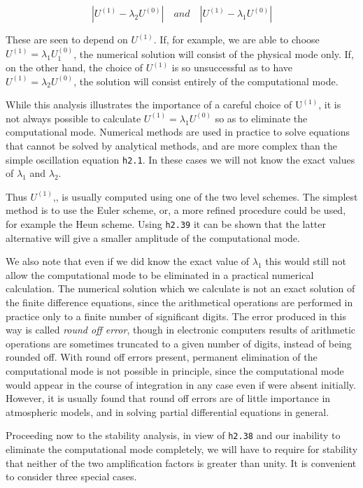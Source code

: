 \[|U^{(1)} - \lambda_2 U^{(0)}| \quad   and   \quad | U^{(1)} - \lambda_1 U^{(0)} |\]

These are seen to depend on \(U^{\left( 1 \right)}\). If, for example,
we are able to choose
\(U^{\left( 1 \right)} = \lambda_{1}U_{1}^{\left( 0 \right)}\), the
numerical solution will consist of the physical mode only. If, on the
other hand, the choice of \(U^{\left( 1 \right)}\) is so unsuccessful as
to have \(U^{\left( 1 \right)} = \lambda_{2}U^{\left( 0 \right)}\), the
solution will consist entirely of the computational mode.

While this analysis illustrates the importance of a careful choice of
\(\text{U}^{\left( 1 \right)}\), it is not always possible to calculate
\(U^{\left( 1 \right)} = \lambda_{1}U^{\left( 0 \right)}\) so as to
eliminate the computational mode. Numerical methods are used in practice
to solve equations that cannot be solved by analytical methods, and are
more complex than the simple oscillation equation \texttt{h2.1}. In
these cases we will not know the exact values of \(\lambda_{1}\) and
\(\lambda_{2}\).

Thus \(U^{\left( 1 \right)}\),, is usually computed using one of the two
level schemes. The simplest method is to use the Euler scheme, or, a
more refined procedure could be used, for example the Heun scheme. Using
\texttt{h2.39} it can be shown that the latter alternative will give a
smaller amplitude of the computational mode.

We also note that even if we did know the exact value of \(\lambda_{1}\)
this would still not allow the computational mode to be eliminated in a
practical numerical calculation. The numerical solution which we
calculate is not an exact solution of the finite difference equations,
since the arithmetical operations are performed in practice only to a
finite number of significant digits. The error produced in this way is
called \emph{round off error}, though in electronic computers results of
arithmetic operations are sometimes truncated to a given number of
digits, instead of being rounded off. With round off errors present,
permanent elimination of the computational mode is not possible in
principle, since the computational mode would appear in the course of
integration in any case even if were absent initially. However, it is
usually found that round off errors are of little importance in
atmospheric models, and in solving partial differential equations in
general.

Proceeding now to the stability analysis, in view of \texttt{h2.38} and
our inability to eliminate the computational mode completely, we will
have to require for stability that neither of the two amplification
factors is greater than unity. It is convenient to consider three
special cases.

